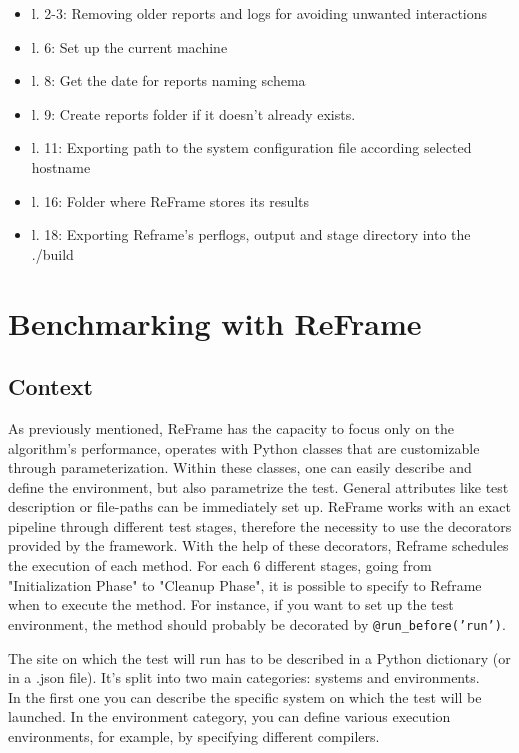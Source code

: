 \documentclass[12pt]{article}
\begin{document}
\begin{itemize}
    \item l. 2-3: Removing older reports and logs for avoiding unwanted interactions
    \item l. 6:   Set up the current machine
    \item l. 8:   Get the date for reports naming schema
    \item l. 9:   Create reports folder if it doesn't already exists.
    \item l. 11:  Exporting path to the system configuration file according selected hostname
    \item l. 16:  Folder where ReFrame stores its results
    \item l. 18:  Exporting Reframe's perflogs, output and stage directory into the ./build
\end{itemize}

\section{Benchmarking with ReFrame}

\subsection{Context}
As previously mentioned, ReFrame has the capacity to focus only on the algorithm's performance, operates with Python classes that are customizable through parameterization.
Within these classes, one can easily describe and define the environment, but also parametrize the test.
General attributes like test description or file-paths can be immediately set up.
ReFrame works with an exact pipeline through different test stages, therefore the necessity to use the decorators provided by the framework.
With the help of these decorators, Reframe schedules the execution of each method.
For each 6 different stages, going from "Initialization Phase" to "Cleanup Phase", it is possible to specify to Reframe when to execute the method.
For instance, if you want to set up the test environment, the method should probably be decorated by \texttt{@run\_before('run')}.

The site on which the test will run has to be described in a Python dictionary (or in a .json file).
It's split into two main categories: systems and environments. \\
In the first one you can describe the specific system on which the test will be launched.
In the environment category, you can define various execution environments, for example, by specifying different compilers.
\end{document}

